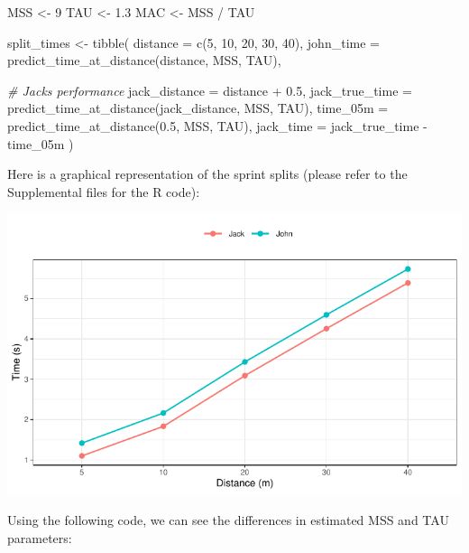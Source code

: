 \documentclass[fleqn,10pt,lineno]{wlpeerj} %
\newenvironment{Shaded}{\begin{snugshade}}{\end{snugshade}}
\newcommand{\AttributeTok}[1]{\textcolor[rgb]{0.77,0.63,0.00}{#1}}
\newcommand{\CommentTok}[1]{\textcolor[rgb]{0.56,0.35,0.01}{\textit{#1}}}
\newcommand{\DecValTok}[1]{\textcolor[rgb]{0.00,0.00,0.81}{#1}}
\newcommand{\FloatTok}[1]{\textcolor[rgb]{0.00,0.00,0.81}{#1}}
\newcommand{\FunctionTok}[1]{\textcolor[rgb]{0.00,0.00,0.00}{#1}}
\newcommand{\NormalTok}[1]{#1}
\newcommand{\OtherTok}[1]{\textcolor[rgb]{0.56,0.35,0.01}{#1}}
\newcommand{\SpecialCharTok}[1]{\textcolor[rgb]{0.00,0.00,0.00}{#1}}
\begin{document}
\begin{Shaded}
\begin{Highlighting}[]
\NormalTok{MSS }\OtherTok{\textless{}{-}} \DecValTok{9}
\NormalTok{TAU }\OtherTok{\textless{}{-}} \FloatTok{1.3}
\NormalTok{MAC }\OtherTok{\textless{}{-}}\NormalTok{ MSS }\SpecialCharTok{/}\NormalTok{ TAU}

\NormalTok{split\_times }\OtherTok{\textless{}{-}} \FunctionTok{tibble}\NormalTok{(}
  \AttributeTok{distance =} \FunctionTok{c}\NormalTok{(}\DecValTok{5}\NormalTok{, }\DecValTok{10}\NormalTok{, }\DecValTok{20}\NormalTok{, }\DecValTok{30}\NormalTok{, }\DecValTok{40}\NormalTok{),}
  \AttributeTok{john\_time =} \FunctionTok{predict\_time\_at\_distance}\NormalTok{(distance, MSS, TAU),}

  \CommentTok{\# Jack\textquotesingle{}s performance}
  \AttributeTok{jack\_distance =}\NormalTok{ distance }\SpecialCharTok{+} \FloatTok{0.5}\NormalTok{,}
  \AttributeTok{jack\_true\_time =} \FunctionTok{predict\_time\_at\_distance}\NormalTok{(jack\_distance, MSS, TAU),}
  \AttributeTok{time\_05m =} \FunctionTok{predict\_time\_at\_distance}\NormalTok{(}\FloatTok{0.5}\NormalTok{, MSS, TAU),}
  \AttributeTok{jack\_time =}\NormalTok{ jack\_true\_time }\SpecialCharTok{{-}}\NormalTok{ time\_05m}
\NormalTok{)}
\end{Highlighting}
\end{Shaded}

Here is a graphical representation of the sprint splits (please refer to the Supplemental files for the R code):

\begin{center}\includegraphics[width=0.9\linewidth]{paper_files/figure-latex/unnamed-chunk-25-1} \end{center}

Using the following code, we can see the differences in estimated MSS and TAU parameters:
\end{document}
